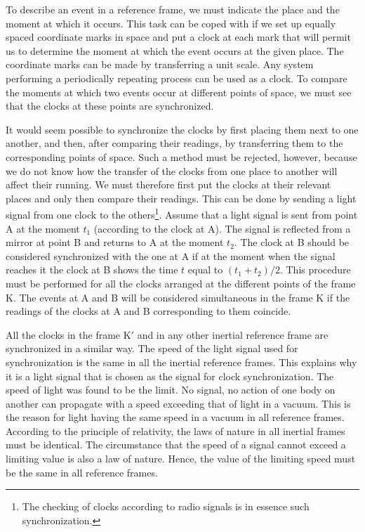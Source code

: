 To describe an event in a reference frame, we must indicate the place and the moment at which it occurs. This task can be coped with if we set up equally spaced coordinate marks in space and put a clock at each mark that will permit us to determine the moment at which the event occurs at the given place. The coordinate marks can be made by transferring a unit scale. Any system performing a periodically repeating process can be used as a clock. To compare the moments at which two events occur at different points of space, we must see that the clocks at these points are synchronized.

It would seem possible to synchronize the clocks by first placing them next to one another, and then, after comparing their readings, by transferring them to the corresponding points of space. Such a method must be rejected, however, because we do not know how the transfer of the clocks from one place to another will affect their running. We must therefore first put the clocks at their relevant places and only then compare their readings. This can be done by sending a light signal from one clock to the others\footnote{The checking of clocks according to radio signals is in essence such synchronization.}. Assume that a light signal is sent from point A at the moment $t_1$ (according to the clock at A). The signal is reflected from a mirror at point B and returns to A at the moment $t_2$. The clock at B should be considered synchronized with the one at A if at the moment when the signal reaches it the clock at B shows the time $t$ equal to $(t_1+t_2)/2$. This procedure must be performed for all the clocks arranged at the different points of the frame K. The events at A and B will be considered simultaneous in the frame K if the readings of the clocks at A and B corresponding to them coincide.

All the clocks in the frame K$'$ and in any other inertial reference frame are synchronized in a similar way. The speed of the light signal used for synchronization is the same in all the inertial reference frames. This explains why it is a light signal that is chosen as the signal for clock synchronization. The speed of light was found to be the limit. No signal, no action of one body on another can propagate with a speed exceeding that of light in a vacuum. This is the reason for light having the same speed in a vacuum in all reference frames. According to the principle of relativity, the laws of nature in all inertial frames must be identical. The circumstance that the speed of a signal cannot exceed a limiting value is also a law of nature. Hence, the value of the limiting speed must be the same in all reference frames.

